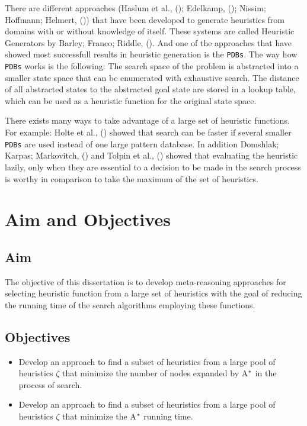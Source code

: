 There are different approaches (Haslum et al., (\citeyear{haslum2007domain}); Edelkamp, (\citeyear{edelkamp2007automated}); Nissim; Hoffmann; Helmert, (\citeyear{nissim2011computing})) that have been developed to generate heuristics from domains with or without knowledge of itself. These systems are called Heuristic Generators by Barley; Franco; Riddle, (\citeyear{BarleySantiagoOver}). And one of the approaches that have showed most successfull results in heuristic generation is the \texttt{PDBs}. The way how \texttt{PDBs} works is the following: The search space of the problem is abstracted into a smaller state space that can be enumerated with exhaustive search. The distance of all abstracted states to the abstracted goal state are stored in a lookup table, which can be used as a heuristic function for the original state space.

There exists many ways to take advantage of a large set of heuristic functions. For example: Holte et al., (\citeyear{holte2006maximizing}) showed that search can be faster if several smaller \texttt{PDBs} are used instead of one large pattern database. In addition Domshlak; Karpas; Markovitch, (\citeyear{domshlak2010max}) and Tolpin et al.,  (\citeyear{tolpin2013towards}) showed that evaluating the heuristic lazily, only when they are essential to a decision to be made in the search process is worthy in comparison to take the maximum of the set of heuristics.
\section{Aim and Objectives}
\subsection{Aim}
\noindent
The objective of this dissertation is to develop meta-reasoning approaches for selecting heuristic function from a large set of heuristics with the goal of reducing the running time of the search algorithms employing these functions.

\subsection{Objectives}
\noindent

\begin{itemize}
  \item Develop an approach to find a subset of heuristics from a large pool of heuristics $\zeta$ that minimize the number of nodes expanded by A$\sp{*}$ in the process of search.
  
  \item Develop an approach to find a subset of heuristics from a large pool of heuristics $\zeta$ that minimize the A$\sp{*}$ running time.

\end{itemize}
